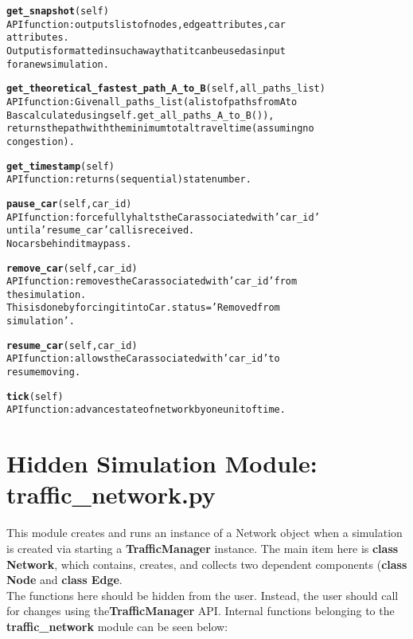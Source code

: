 \begin{alltt}
\textbf{get_snapshot}(self)
API function:  outputs list of nodes, edge attributes, car 
attributes.
Output is formatted in such a way that it can be used as input 
for a new simulation.

\textbf{get_theoretical_fastest_path_A_to_B}(self, all_paths_list)
API function:  Given all_paths_list (a list of paths from A to 
B as calculated using self.get_all_paths_A_to_B()),
returns the path with the minimum total travel time (assuming no
congestion).

\textbf{get_timestamp}(self)
API function:  returns (sequential) state number.

\textbf{pause_car}(self, car_id)
API function:  forcefully halts the Car associated with 'car_id' 
until a 'resume_car' call is received.
No cars behind it may pass.

\textbf{remove_car}(self, car_id)
API function:  removes the Car associated with 'car_id' from
the simulation.
This is done by forcing it into Car.status = 'Removed from 
simulation'.

\textbf{resume_car}(self, car_id)
API function:  allows the Car associated with 'car_id' to 
resume moving.

\textbf{tick}(self)
API function:  advance state of network by one unit of time.


\end{alltt}

\section{Hidden Simulation Module: traffic\_network.py}

This module creates and runs an instance of a Network object when a simulation is created via starting a \textbf{TrafficManager} instance.  The main item here is \textbf{class Network}, which  contains, creates, and collects two dependent components (\textbf{class Node} and \textbf{class Edge}.  \\

\noindent The functions here should be hidden from the user.  Instead, the user should call for changes using the\textbf{TrafficManager} API.  Internal functions belonging to the \textbf{traffic\_network} module can be seen below:

